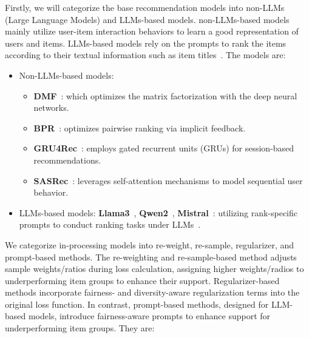 Firstly, we will categorize the base recommendation models into non-LLMs (Large Language Models) and LLMs-based models.
non-LLMs-based models mainly utilize user-item interaction behaviors to learn a good representation of users and items.
LLMs-based models rely on the prompts to rank the items according to their textual information such as item titles~\cite{LLMs_Fairness_Survey, DaiUncovering}. The  models are:
\begin{itemize}[leftmargin=*]
    \item Non-LLMs-based models: 
    \begin{itemize}[leftmargin=*]
        \item  \textbf{DMF}~\cite{DMF}: which optimizes the matrix factorization with the deep neural networks.
        \item \textbf{BPR}~\cite{BPR}: optimizes pairwise ranking via implicit feedback. \item \textbf{GRU4Rec}~\cite{tan2016improved}: employs gated recurrent units (GRUs) for session-based recommendations. \item \textbf{SASRec}~\cite{SASRec}: leverages self-attention mechanisms to model sequential user behavior.
    \end{itemize}
    
    \item LLMs-based models: \textbf{Llama3}~\cite{dubey2024llama}, \textbf{Qwen2}~\cite{bai2023qwen}, \textbf{Mistral}~\cite{jiang2023mistral7b}: utilizing rank-specific prompts to conduct ranking tasks under LLMs~\cite{DaiUncovering}.
\end{itemize}

\noindent%
We categorize in-processing models into re-weight, re-sample, regularizer, and prompt-based methods. 
The re-weighting and re-sample-based method adjusts sample weights/ratios during loss calculation, assigning higher weights/radios to underperforming item groups to enhance their support. Regularizer-based methods incorporate fairness- and diversity-aware regularization terms into the original loss function. In contrast, prompt-based methods, designed for LLM-based models, introduce fairness-aware prompts to enhance support for underperforming item groups. They are:

